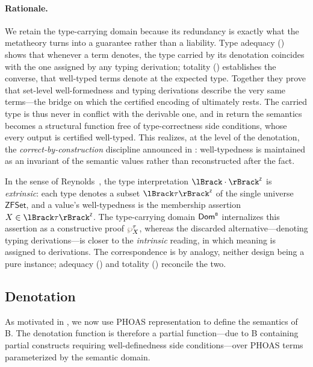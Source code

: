 \paragraph{Rationale.}
We retain the type-carrying domain because its redundancy is exactly what the metatheory
turns into a guarantee rather than a liability. Type adequacy
() shows that whenever a term denotes, the type carried by
its denotation coincides with the one assigned by any typing derivation; totality
() establishes the converse, that well-typed terms denote at
the expected type. Together they prove that set-level well-formedness and typing
derivations describe the very same terms---the bridge on which the certified encoding of
 ultimately rests. The carried type is thus never in conflict with the
derivable one, and in return the semantics becomes a structural function free of
type-correctness side conditions, whose every output is certified well-typed. This realizes, at the level of the
denotation, the \emph{correct-by-construction} discipline announced in
: well-typedness is maintained as an invariant of the semantic
values rather than reconstructed after the fact.

\begin{note}
  In the sense of Reynolds~\cite{reynolds2000meaning}, the type interpretation
  \(\interpZ{\cdot}\) is \emph{extrinsic}: each type denotes a subset \(\interpZ{\tau}\)
  of the single universe \(\mathsf{ZFSet}\), and a value's well-typedness is the
  membership assertion \(X \in \interpZ{\tau}\). The type-carrying domain \({\mathsf{Dom}^{\scriptscriptstyle{\mathsf{B}}}}\)
  internalizes this assertion as a constructive proof \(\pf{\tau}{X}\), whereas the
  discarded alternative---denoting typing derivations---is closer to the
  \emph{intrinsic} reading, in which meaning is assigned to derivations. The
  correspondence is by analogy, neither design being a pure instance; adequacy
  () and totality () reconcile
  the two.
\end{note}

\subsection{Denotation}
\label{subsec:b-denote}

As motivated in , we now use PHOAS representation to define the semantics of B.
The denotation function is therefore a partial function---due to B containing partial constructs requiring well-definedness side conditions---over PHOAS terms parameterized by the semantic domain.

